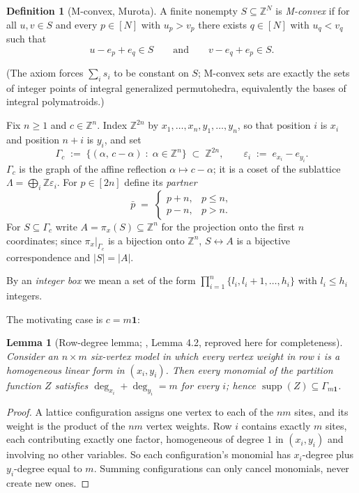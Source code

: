 \documentclass[11pt]{article}
\newtheorem{lemma}[theorem]{Lemma}
\theoremstyle{definition}
\newtheorem*{definition*}{Definition}
\newcommand{\Z}{\mathbb{Z}}
\newcommand{\supp}{\operatorname{supp}}
\begin{document}
\begin{definition*}[M-convex, Murota]
A finite nonempty $S\subseteq\Z^N$ is \emph{M-convex} if for all $u,v\in S$ and every
$p\in[N]$ with $u_p>v_p$ there exists $q\in[N]$ with $u_q<v_q$ such that
\[
u-e_p+e_q\in S \qquad\text{and}\qquad v-e_q+e_p\in S .
\]
\end{definition*}
(The axiom forces $\sum_i s_i$ to be constant on $S$; M-convex sets are exactly the sets of
integer points of integral generalized permutohedra, equivalently the bases of integral
polymatroids.)

Fix $n\ge1$ and $c\in\Z^n$. Index $\Z^{2n}$ by $x_1,\dots,x_n,y_1,\dots,y_n$, so that
position $i$ is $x_i$ and position $n+i$ is $y_i$, and set
\[
\Gamma_c \;:=\; \{(\alpha,\,c-\alpha)\;:\;\alpha\in\Z^n\}\;\subset\;\Z^{2n},
\qquad
\varepsilon_i \;:=\; e_{x_i}-e_{y_i}.
\]
$\Gamma_c$ is the graph of the affine reflection $\alpha\mapsto c-\alpha$; it is a coset of
the sublattice $\Lambda=\bigoplus_i\Z\varepsilon_i$. For $p\in[2n]$ define its \emph{partner}
\[
\bar p \;=\; \begin{cases} p+n, & p\le n,\\ p-n, & p>n.\end{cases}
\]
For $S\subseteq\Gamma_c$ write $A=\pi_x(S)\subseteq\Z^n$ for the projection onto the first
$n$ coordinates; since $\pi_x|_{\Gamma_c}$ is a bijection onto $\Z^n$, $S\leftrightarrow A$
is a bijective correspondence and $|S|=|A|$.

By an \emph{integer box} we mean a set of the form $\prod_{i=1}^n\{l_i,l_i+1,\dots,h_i\}$
with $l_i\le h_i$ integers.

\medskip
The motivating case is $c=m\mathbf{1}$:

\begin{lemma}[Row-degree lemma; \cite{c1}, Lemma 4.2, reproved here for completeness]
\label{lem:rowdeg}
Consider an $n\times m$ six-vertex model in which every vertex weight in row $i$ is a
homogeneous linear form in $(x_i,y_i)$. Then every monomial of the partition function $Z$
satisfies $\deg_{x_i}+\deg_{y_i}=m$ for every $i$; hence
$\supp(Z)\subseteq\Gamma_{m\mathbf 1}$.
\end{lemma}
\begin{proof}
A lattice configuration assigns one vertex to each of the $nm$ sites, and its weight is the
product of the $nm$ vertex weights. Row $i$ contains exactly $m$ sites, each contributing
exactly one factor, homogeneous of degree $1$ in $(x_i,y_i)$ and involving no other
variables. So each configuration's monomial has $x_i$-degree plus $y_i$-degree equal to $m$.
Summing configurations can only cancel monomials, never create new ones.
\end{proof}
\end{document}
